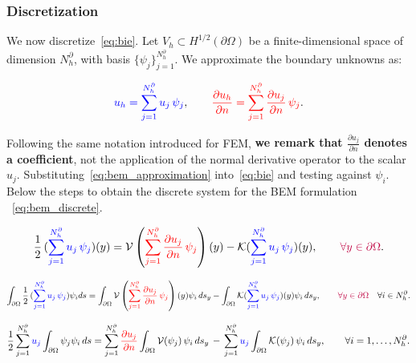 \documentclass[11pt,onecolumn]{article}
\begin{document}
\subsubsection{Discretization}
We now discretize~\eqref{eq:bie}. Let $V_h \subset H^{1/2}(\partial\Omega)$ be a finite-dimensional space of dimension $N_h^{\partial}$, with basis $\{\psi_j\}_{j=1}^{N_h^{\partial}}$. We approximate the boundary unknowns as:

\begin{equation}
{\color{blue}u_h = \sum_{j=1}^{N_h^{\partial}} u_j\, \psi_j}, 
\qquad 
{\color{red}\frac{\partial u_h}{\partial n} = \sum_{j=1}^{N_h^{\partial}} \frac{\partial u_j}{\partial n}\, \psi_j}.
\label{eq:bem_approximation}
\end{equation}

Following the same notation introduced for FEM, \textbf{we remark that $\frac{\partial u_j}{\partial n}$ denotes a coefficient}, not the application of the normal derivative operator to the scalar $u_j$. Substituting~\eqref{eq:bem_approximation} into~\eqref{eq:bie} and testing against $\psi_i$. Below the steps to obtain the discrete system for the BEM formulation ~\eqref{eq:bem_discrete}. 

\begin{equation}
\frac{1}{2}\,({\color{blue}\sum_{j=1}^{N_h^{\partial}} u_j\, \psi_j})(y) = \mathcal{V}\left({\color{red}\sum_{j=1}^{N_h^{\partial}} \frac{\partial u_j}{\partial n}\, \psi_j}\right)(y) - \mathcal{K}({\color{blue}\sum_{j=1}^{N_h^{\partial}} u_j\, \psi_j})(y), 
\qquad{\color{purple} \forall y \in \partial\Omega}.
\label{eq:bem_discrete_step1}
\end{equation}

\begin{equation}
\int_{\partial\Omega}\frac{1}{2}\,({\color{blue}\sum_{j=1}^{N_h^{\partial}} u_j\, \psi_j})\psi_i ds= \int_{\partial\Omega}\mathcal{V}\left({\color{red}\sum_{j=1}^{N_h^{\partial}} \frac{\partial u_j}{\partial n}\, \psi_j}\right)(y)\psi_i \, ds_y - \int_{\partial\Omega}\mathcal{K}({\color{blue}\sum_{j=1}^{N_h^{\partial}} u_j\, \psi_j})(y)\psi_i \, ds_y, 
\qquad{\color{purple} \forall y \in \partial\Omega} \quad \forall i \in N_h^{\partial}.
\label{eq:bem_discrete_step2}
\end{equation}

\begin{equation}
\frac{1}{2}\sum_{j=1}^{N_h^{\partial}} {\color{blue}u_j} \int_{\partial\Omega} \psi_j \psi_i\, ds
=
\sum_{j=1}^{N_h^{\partial}} {\color{red}\frac{\partial u_j}{\partial n} }\int_{\partial\Omega} \mathcal{V}(\psi_j)\, \psi_i\, ds_y
\,-\,
\sum_{j=1}^{N_h^{\partial}} {\color{blue}u_j} \int_{\partial\Omega} \mathcal{K}(\psi_j)\, \psi_i\, ds_y,
\qquad \forall i = 1,\dots,N_h^{\partial}.
\label{eq:bem_discrete}
\end{equation}
\end{document}
